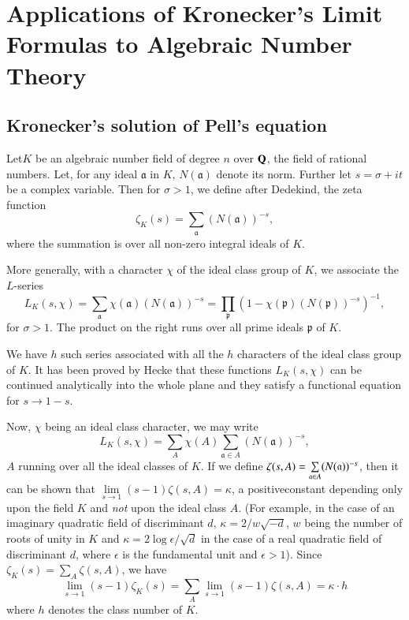 
\chapter[Applications of Kronecker's Limit...]{Applications of Kronecker's Limit Formulas to Algebraic
  Number Theory}\label{chap2}

\setcounter{section}{0}
\section{Kronecker's solution of Pell's
  equation}\label{chap2:sec1} 


Let\pageoriginale $K$ be an algebraic number field of degree $n$ over
$\mathbf{Q}$, the 
field of rational numbers. Let, for any ideal $\mathfrak{a}$ in $K$,
$N(\mathfrak{a})$ denote its norm. Further let $s=\sigma+it$ be a
complex variable. Then for $\sigma>1$, we define after Dedekind, the
zeta function
$$
\zeta_{K}(s)=\sum_{\mathfrak{a}}(N(\mathfrak{a}))^{-s},
$$
where the summation is over all non-zero integral ideals of $K$.

More generally, with a character $\chi$ of the ideal class group of
$K$, we associate the $L$-series
$$
L_{K}(s,\chi)=\sum_{\mathfrak{a}}\chi(\mathfrak{a})(N(\mathfrak{a}))^{-s}=\prod_{\mathfrak{p}}(1-\chi(\mathfrak{p})(N(\mathfrak{p}))^{-s})^{-1}, 
$$
for $\sigma>1$. The product on the right runs over all prime ideals
$\mathfrak{p}$ of $K$.

We have $h$ such series associated with all the $h$ characters of the
ideal class group of $K$. It has been proved by Hecke that these
functions $L_{K}(s,\chi)$ can be continued analytically into the whole
plane and they satisfy a functional equation for $s\to 1-s$.

Now, $\chi$ being an ideal class character, we may write
$$
L_{K}(s,\chi)=\sum_{A}\chi(A)\sum_{\mathfrak{a}\in
  A}(N(\mathfrak{a}))^{-s},
$$
$A$ running over all the ideal classes of $K$. If we define
$\zeta(s,A)=\break\sum\limits_{\mathfrak{a}\in A}(N(\mathfrak{a}))^{-s}$,
then it can be shown that $\lim\limits_{s\to
  1}(s-1)\zeta(s,A)=\kappa$, a positive\pageoriginale constant
depending only upon the field $K$ and {\em not} upon the ideal class
$A$. (For example, in the case of an imaginary quadratic field of
discriminant $d$, $\kappa=2/w\sqrt{-d}$, $w$ being the number of roots
of unity in $K$ and $\kappa=2\log \epsilon/\sqrt{d}$ in the case of a
real quadratic field of discriminant $d$, where $\epsilon$ is the
fundamental unit and $\epsilon>1$). Since
$\zeta_{K}(s)=\sum\limits_{A}\zeta(s,A)$, we have
$$
\lim\limits_{s\to 1}(s-1)\zeta_{K}(s)=\sum_{A}\lim\limits_{s\to
  1}(s-1)\zeta(s,A)=\kappa\cdot h
$$
where $h$ denotes the class number of $K$.

